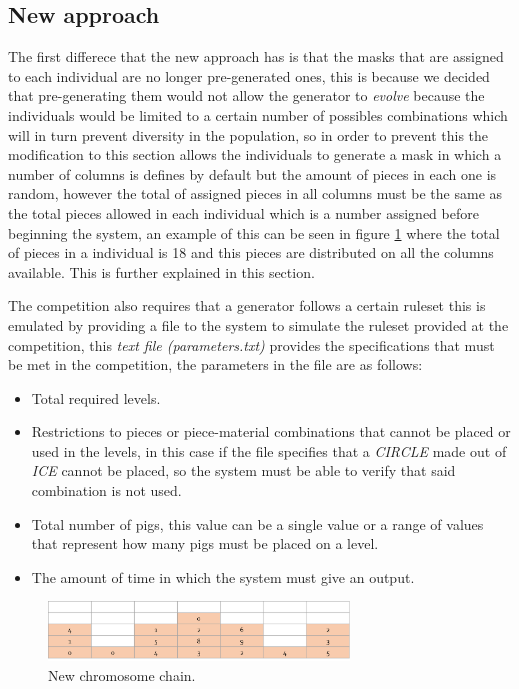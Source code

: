 \documentclass[conference]{IEEEtran}
\begin{document}
    \subsection{New approach}
    
    The first differece that the new approach has is that the masks that are assigned
    to each individual are no longer pre-generated ones, this is because we decided
    that pre-generating them would not allow the generator to \textit{evolve}
    because the individuals would be limited to a certain number of possibles
    combinations which will in turn prevent diversity in the population, so in order
    to prevent this the modification to this section allows the individuals to
    generate a mask in which a number of columns is defines by default but the
    amount of pieces in each one is random, however the total of assigned pieces in
    all columns must be the same as the total pieces allowed in each individual
    which is a number assigned before beginning the system, an example of this
    can be seen in figure \ref{new_chrom} where the total of pieces in a individual
    is 18 and this pieces are distributed on all the columns available. This is
    further explained in this section.
    
    The competition also requires that a generator follows a certain ruleset this is 
    emulated by providing a file to the system to simulate the ruleset provided at the 
    competition, this \textit{text file
    (parameters.txt)} provides the specifications that must be met in the
    competition, the parameters in the file are as follows:
    
    \begin{itemize}
        \item Total required levels.
        \item Restrictions to pieces or piece-material combinations that cannot be
        placed or used in the levels, in this case if the file specifies that a
        \textit{CIRCLE} made out of \textit{ICE} cannot be placed, so the system must be
        able to verify that said combination is not used.
        \item Total number of pigs, this value can be a single value or a range of
        values that represent how many pigs must be placed on a level.
        \item The amount of time in which the system must give an output.
    \end{itemize}
    
    \begin{figure}[htbp]
    \centerline{\includegraphics[width=80mm]{Images/chromosome_chain_new_model.png}}
    \caption{New chromosome chain.}
    \label{new_chrom}
    \end{figure}
    
\end{document}
